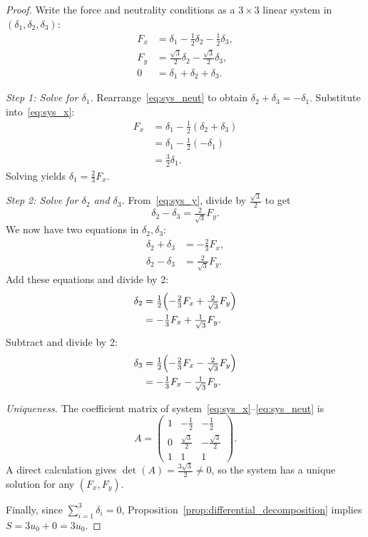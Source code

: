 \documentclass[10pt,a4paper]{amsart}
\begin{document}
\begin{proof}
Write the force and neutrality conditions as a $3 \times 3$ linear system in 
$(\delta_1, \delta_2, \delta_3)$:
\begin{align}
F_x &= \delta_1 - \tfrac{1}{2}\delta_2 - \tfrac{1}{2}\delta_3, \label{eq:sys_x} \\
F_y &= \tfrac{\sqrt{3}}{2}\delta_2 - \tfrac{\sqrt{3}}{2}\delta_3, \label{eq:sys_y} \\
0   &= \delta_1 + \delta_2 + \delta_3. \label{eq:sys_neut}
\end{align}

\emph{Step 1: Solve for $\delta_1$.}
Rearrange~\eqref{eq:sys_neut} to obtain $\delta_2 + \delta_3 = -\delta_1$. 
Substitute into~\eqref{eq:sys_x}:
\[
\begin{aligned}
F_x &= \delta_1 - \tfrac{1}{2}(\delta_2 + \delta_3) \\
    &= \delta_1 - \tfrac{1}{2}(-\delta_1) \\
    &= \tfrac{3}{2}\delta_1.
\end{aligned}
\]
Solving yields $\delta_1 = \tfrac{2}{3} F_x$.

\emph{Step 2: Solve for $\delta_2$ and $\delta_3$.}
From~\eqref{eq:sys_y}, divide by $\tfrac{\sqrt{3}}{2}$ to get
\[
\delta_2 - \delta_3 = \tfrac{2}{\sqrt{3}} F_y.
\]
We now have two equations in $\delta_2, \delta_3$:
\[
\begin{aligned}
\delta_2 + \delta_3 &= -\tfrac{2}{3} F_x, \\
\delta_2 - \delta_3 &= \tfrac{2}{\sqrt{3}} F_y.
\end{aligned}
\]
Add these equations and divide by 2:
\[
\begin{aligned}
\delta_2 &= \tfrac{1}{2}\Bigl(-\tfrac{2}{3} F_x + \tfrac{2}{\sqrt{3}} F_y\Bigr) \\
         &= -\tfrac{1}{3} F_x + \tfrac{1}{\sqrt{3}} F_y.
\end{aligned}
\]
Subtract and divide by 2:
\[
\begin{aligned}
\delta_3 &= \tfrac{1}{2}\Bigl(-\tfrac{2}{3} F_x - \tfrac{2}{\sqrt{3}} F_y\Bigr) \\
         &= -\tfrac{1}{3} F_x - \tfrac{1}{\sqrt{3}} F_y.
\end{aligned}
\]

\emph{Uniqueness.}
The coefficient matrix of system~\eqref{eq:sys_x}--\eqref{eq:sys_neut} is
\[
A = \begin{pmatrix}
1 & -\tfrac{1}{2} & -\tfrac{1}{2} \\[2pt]
0 & \tfrac{\sqrt{3}}{2} & -\tfrac{\sqrt{3}}{2} \\[2pt]
1 & 1 & 1
\end{pmatrix}.
\]
A direct calculation gives $\det(A) = \tfrac{3\sqrt{3}}{2} \neq 0$, so the system has a unique 
solution for any $(F_x, F_y)$.

Finally, since $\sum_{i=1}^{3} \delta_i = 0$, Proposition~\ref{prop:differential_decomposition} 
implies $S = 3u_0 + 0 = 3u_0$.
\end{proof}
\end{document}
